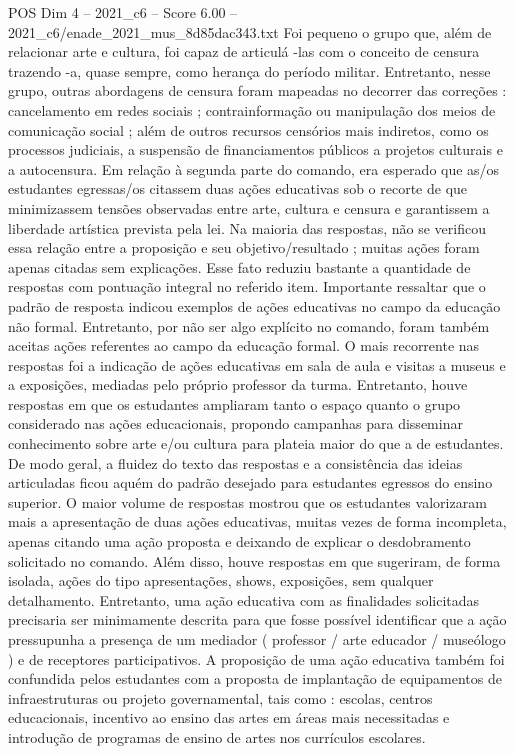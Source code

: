 \begin{textsample}{POS Dim 4 – 2021\_c6 – Score 6.00 – 2021\_c6/enade\_2021\_mus\_8d85dac343.txt}
Foi pequeno o grupo que, além de relacionar arte e cultura, foi capaz de articulá -las com o conceito de censura trazendo -a, quase sempre, como herança do período militar.
Entretanto, nesse grupo, outras abordagens de censura foram mapeadas no decorrer das correções : cancelamento em redes sociais ; contrainformação ou manipulação dos meios de comunicação social ; além de outros recursos censórios mais indiretos, como os processos judiciais, a suspensão de financiamentos públicos a projetos culturais e a autocensura.
Em relação à segunda parte do comando, era esperado que as/os estudantes egressas/os citassem duas ações educativas sob o recorte de que minimizassem tensões observadas entre arte, cultura e censura e garantissem a liberdade artística prevista pela lei.
Na maioria das respostas, não se verificou essa relação entre a proposição e seu objetivo/resultado ; muitas ações foram apenas citadas sem explicações.
Esse fato reduziu bastante a quantidade de respostas com pontuação integral no referido item.
Importante ressaltar que o padrão de resposta indicou exemplos de ações educativas no campo da educação não formal.
Entretanto, por não ser algo explícito no comando, foram também aceitas ações referentes ao campo da educação formal.
O mais recorrente nas respostas foi a indicação de ações educativas em sala de aula e visitas a museus e a exposições, mediadas pelo próprio professor da turma.
Entretanto, houve respostas em que os estudantes ampliaram tanto o espaço quanto o grupo considerado nas ações educacionais, propondo campanhas para disseminar conhecimento sobre arte e/ou cultura para plateia maior do que a de estudantes.
De modo geral, a fluidez do texto das respostas e a consistência das ideias articuladas ficou aquém do padrão desejado para estudantes egressos do ensino superior.
O maior volume de respostas mostrou que os estudantes valorizaram mais a apresentação de duas ações educativas, muitas vezes de forma incompleta, apenas citando uma ação proposta e deixando de explicar o desdobramento solicitado no comando.
Além disso, houve respostas em que sugeriram, de forma isolada, ações do tipo apresentações, shows, exposições, sem qualquer detalhamento.
Entretanto, uma ação educativa com as finalidades solicitadas precisaria ser minimamente descrita para que fosse possível identificar que a ação pressupunha a presença de um mediador ( professor / arte educador / museólogo ) e de receptores participativos.
A proposição de uma ação educativa também foi confundida pelos estudantes com a proposta de implantação de equipamentos de infraestruturas ou projeto governamental, tais como : escolas, centros educacionais, incentivo ao ensino das artes em áreas mais necessitadas e introdução de programas de ensino de artes nos currículos escolares.

\end{textsample}
